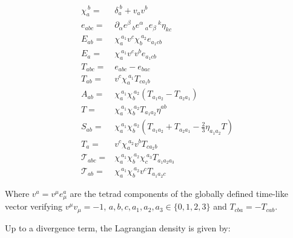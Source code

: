 \documentclass[11pt]{book}
\begin{document}
\begin{equation}\begin{aligned}
    \chi_{a}^{\ b}=&\delta_{a}^{\ b}+v_{a} v^{b}\\
    e_{a b c}=&\partial_{\alpha}{e^{\beta}\,_{b}} e^{\alpha}\,_{a} e_{\beta}\,^{k}\eta_{k c}\\
    E_{a b}=& \chi_{a}^{\ a_1} v^{c} \chi_{b}^{\ a_2} e_{a_1 c b}\\
    E_{a}=& \chi_{a}^{\ a_1} v^{c} v^{b} e_{a_1 c b}\\
    T_{a b c}=&e_{a b c}-e_{b a c}\\
    T_{a b}=& v^{c} \chi_{a}^{\ a_1} T_{c a_1 b}\\
    A_{a b}=& \chi_{a}^{\ a_1} \chi_{b}^{\ a_2} (T_{a_1 a_2}-T_{a_2 a_1})\\
    T=&\chi_{a}^{\ a_1} \chi_{b}^{\ a_2} T_{a_1 a_2} \eta^{a b}\\
    S_{a b}=&\chi_{a}^{\ a_1}\chi_{b}^{\ a_2}(T_{a_1 a_2}+T_{a_2 a_1}-\frac{2}{3}\eta_{a_1 a_2} T)\\
    T_{a}=&v^c \chi_{a}^{\ a_2} v^{b} T_{c a_2 b}\\
    \mathcal{T}_{a b c}=& \chi_{a}^{\ a_1} \chi_{b}^{\ a_2} \chi_{c}^{\ a_3} T_{a_1 a_2 a_3}\\
    \mathcal{T}_{a b}=& \chi_{a}^{\ a_1} \chi_{b}^{\ a_2} v^{c} T_{a_1 a_2 c}\end{aligned}\end{equation}

Where \(v^a=v^\mu e_\mu^a\) are the tetrad components of the globally
defined time-like vector verifying \(v^\mu v_\mu=-1\),
\(a,b,c,a_1,a_2,a_3\in\{0,1,2,3\}\) and \(T_{c b a}=-T_{c a b}\).

Up to a divergence term, the Lagrangian density is given by:
\end{document}
